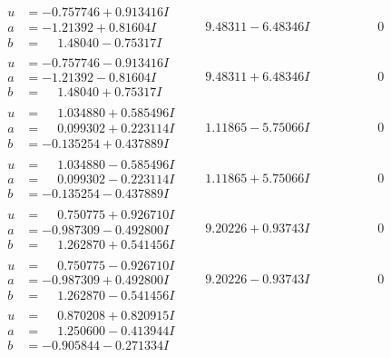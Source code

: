 \documentclass[1p]{elsarticle_modified}
\theoremstyle{definition}
\begin{document}
$$\begin{array}{c|c|c}
\begin{aligned}
u &= -0.757746 + 0.913416 I \\
a &= -1.21392 + 0.81604 I \\
b &= \phantom{-}1.48040 - 0.75317 I\end{aligned}
 & \phantom{-}9.48311 - 6.48346 I & \phantom{-0.000000 } 0 \\ \hline\begin{aligned}
u &= -0.757746 - 0.913416 I \\
a &= -1.21392 - 0.81604 I \\
b &= \phantom{-}1.48040 + 0.75317 I\end{aligned}
 & \phantom{-}9.48311 + 6.48346 I & \phantom{-0.000000 } 0 \\ \hline\begin{aligned}
u &= \phantom{-}1.034880 + 0.585496 I \\
a &= \phantom{-}0.099302 + 0.223114 I \\
b &= -0.135254 + 0.437889 I\end{aligned}
 & \phantom{-}1.11865 - 5.75066 I & \phantom{-0.000000 } 0 \\ \hline\begin{aligned}
u &= \phantom{-}1.034880 - 0.585496 I \\
a &= \phantom{-}0.099302 - 0.223114 I \\
b &= -0.135254 - 0.437889 I\end{aligned}
 & \phantom{-}1.11865 + 5.75066 I & \phantom{-0.000000 } 0 \\ \hline\begin{aligned}
u &= \phantom{-}0.750775 + 0.926710 I \\
a &= -0.987309 - 0.492800 I \\
b &= \phantom{-}1.262870 + 0.541456 I\end{aligned}
 & \phantom{-}9.20226 + 0.93743 I & \phantom{-0.000000 } 0 \\ \hline\begin{aligned}
u &= \phantom{-}0.750775 - 0.926710 I \\
a &= -0.987309 + 0.492800 I \\
b &= \phantom{-}1.262870 - 0.541456 I\end{aligned}
 & \phantom{-}9.20226 - 0.93743 I & \phantom{-0.000000 } 0 \\ \hline\begin{aligned}
u &= \phantom{-}0.870208 + 0.820915 I \\
a &= \phantom{-}1.250600 - 0.413944 I \\
b &= -0.905844 - 0.271334 I\end{aligned}

\end{array}$$
\end{document}
